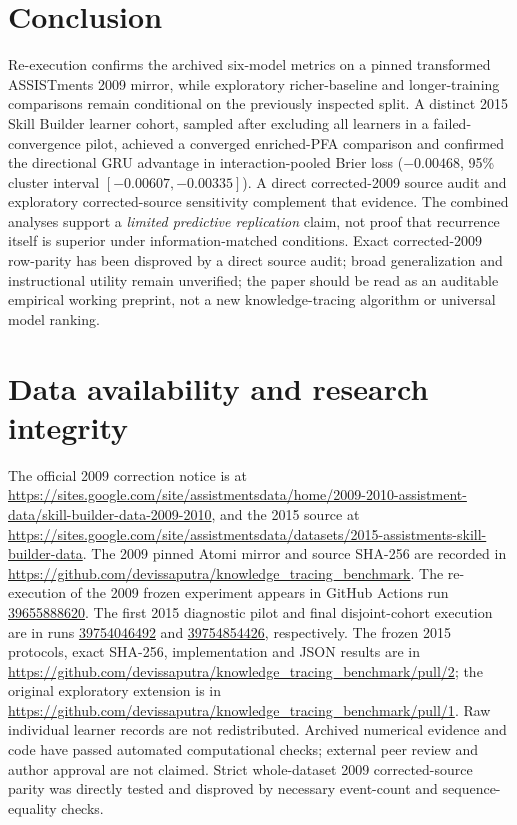 \documentclass[11pt,a4paper]{article}
\begin{document}
\section{Conclusion}
Re-execution confirms the archived six-model metrics on a pinned transformed ASSISTments 2009 mirror, while exploratory richer-baseline and longer-training comparisons remain conditional on the previously inspected split. A distinct 2015 Skill Builder learner cohort, sampled after excluding all learners in a failed-convergence pilot, achieved a converged enriched-PFA comparison and confirmed the directional GRU advantage in interaction-pooled Brier loss ($-0.00468$, 95\% cluster interval $[-0.00607,-0.00335]$). A direct corrected-2009 source audit and exploratory corrected-source sensitivity complement that evidence. The combined analyses support a \emph{limited predictive replication} claim, not proof that recurrence itself is superior under information-matched conditions. Exact corrected-2009 row-parity has been disproved by a direct source audit; broad generalization and instructional utility remain unverified; the paper should be read as an auditable empirical working preprint, not a new knowledge-tracing algorithm or universal model ranking.

\section*{Data availability and research integrity}
The official 2009 correction notice is at \url{https://sites.google.com/site/assistmentsdata/home/2009-2010-assistment-data/skill-builder-data-2009-2010}, and the 2015 source at \url{https://sites.google.com/site/assistmentsdata/datasets/2015-assistments-skill-builder-data}. The 2009 pinned Atomi mirror and source SHA-256 are recorded in \url{https://github.com/devissaputra/knowledge_tracing_benchmark}. The re-execution of the 2009 frozen experiment appears in GitHub Actions run \href{https://github.com/devissaputra/knowledge_tracing_benchmark/actions/runs/39655888620}{39655888620}. The first 2015 diagnostic pilot and final disjoint-cohort execution are in runs \href{https://github.com/devissaputra/knowledge_tracing_benchmark/actions/runs/39754046492}{39754046492} and \href{https://github.com/devissaputra/knowledge_tracing_benchmark/actions/runs/39754854426}{39754854426}, respectively. The frozen 2015 protocols, exact SHA-256, implementation and JSON results are in \url{https://github.com/devissaputra/knowledge_tracing_benchmark/pull/2}; the original exploratory extension is in \url{https://github.com/devissaputra/knowledge_tracing_benchmark/pull/1}. Raw individual learner records are not redistributed. Archived numerical evidence and code have passed automated computational checks; external peer review and author approval are not claimed. Strict whole-dataset 2009 corrected-source parity was directly tested and disproved by necessary event-count and sequence-equality checks.
\end{document}
